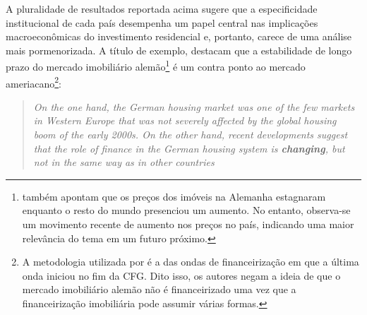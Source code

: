 A pluralidade de resultados reportada acima sugere que a especificidade institucional de cada país desempenha um papel central nas implicações macroeconômicas do investimento residencial e, portanto, carece de uma análise mais pormenorizada. A título de exemplo, \textcite{wijburg_alternative_2017} destacam que a estabilidade de longo prazo do mercado imobiliário alemão\footnote{
	\textcite{wijburg_alternative_2017} também apontam que os preços dos imóveis na Alemanha estagnaram enquanto o resto do mundo presenciou um aumento. No entanto, observa-se um movimento recente de aumento nos preços no país, indicando uma maior relevância do tema em um futuro próximo.} é um contra ponto ao mercado ameriacano\footnote{
	A metodologia utilizada por \textcite{wijburg_alternative_2017} é a das ondas de financeirização em que a última onda iniciou no fim da CFG. Dito isso, os autores negam a ideia de que o mercado imobiliário alemão não é financeirizado uma vez que a financeirização imobiliária pode assumir várias formas.}:

\begin{quote}
	\textit{On the one hand, the German housing market was one of the few markets in Western Europe that was not severely affected by the global housing boom of the early 2000s. On the other hand, recent developments suggest that the role of finance in the German housing system is \textbf{changing}, but not in the same way as in other countries} \cite[p.~969, grifos adicionados]{wijburg_alternative_2017}
\end{quote} 


